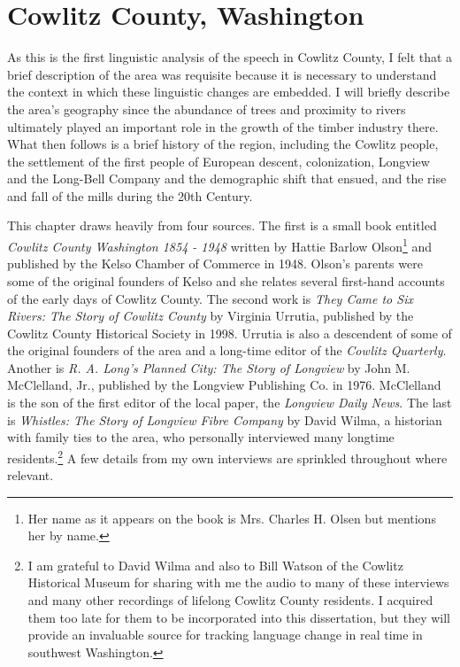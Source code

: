 \chapter{Cowlitz County, Washington}
\label{ch:cowlitz_county}

As this is the first linguistic analysis of the speech in Cowlitz County, I felt that a brief description of the area was requisite because it is necessary to understand the context in which these linguistic changes are embedded. I will briefly describe the area's geography since the abundance of trees and proximity to rivers ultimately played an important role in the growth of the timber industry there. What then follows is a brief history of the region, including the Cowlitz people, the settlement of the first people of European descent, colonization, Longview and the Long-Bell Company and the demographic shift that ensued, and the rise and fall of the mills during the 20th Century.

This chapter draws heavily from four sources. The first is a small book entitled \textit{Cowlitz County Washington 1854 - 1948} written by Hattie Barlow Olson\footnote{Her name as it appears on the book is Mrs. Charles H. Olsen but \citet[177]{urrutia_1998} mentions her by name.} and published by the Kelso Chamber of Commerce in 1948. Olson's parents were some of the original founders of Kelso and she relates several first-hand accounts of the early days of Cowlitz County. The second work is \textit{They Came to Six Rivers: The Story of Cowlitz County} by Virginia Urrutia, published by the Cowlitz County Historical Society in 1998. Urrutia is also a descendent of some of the original founders of the area and a long-time editor of the \textit{Cowlitz Quarterly}. Another is \textit{R. A. Long's Planned City: The Story of Longview} by John M. McClelland, Jr., published by the Longview Publishing Co. in 1976. McClelland is the son of the first editor of the local paper, the \textit{Longview Daily News}. The last is \textit{Whistles: The Story of Longview Fibre Company} by David Wilma, a historian with family ties to the area, who personally interviewed many longtime residents.\footnote{I am grateful to David Wilma and also to Bill Watson of the Cowlitz Historical Museum for sharing with me the audio to many of these interviews and many other recordings of lifelong Cowlitz County residents. I acquired them too late for them to be incorporated into this dissertation, but they will provide an invaluable source for tracking language change in real time in southwest Washington. } A few details from my own interviews are sprinkled throughout where relevant.

